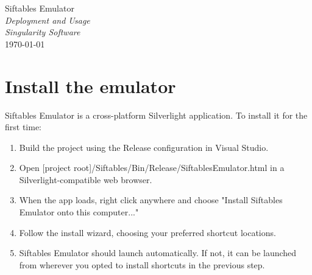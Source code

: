 \documentclass[12pt]{article}
\begin{document}
\begin{center}
	\LARGE{Siftables Emulator} \\
	\LARGE{\textit{Deployment and Usage}}\\
	\Large{\textit{Singularity Software}} \\
	\vspace{.05in}
	\normalsize{\today} \\
\end{center}

\section{Install the emulator}
Siftables Emulator is a cross-platform Silverlight application. To install it for the first time:
\begin{enumerate}
\item Build the project using the Release configuration in Visual Studio.
\item Open [project root]/Siftables/Bin/Release/SiftablesEmulator.html in a Silverlight-compatible web browser.
\item When the app loads, right click anywhere and choose "Install Siftables Emulator onto this computer..."
\item Follow the install wizard, choosing your preferred shortcut locations.
\item Siftables Emulator should launch automatically. If not, it can be launched from wherever you opted to install shortcuts in the previous step.
\end{enumerate}
\end{document}
